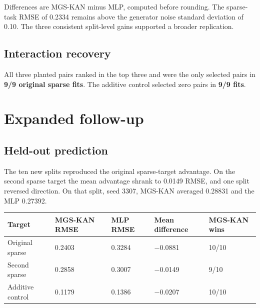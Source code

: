 \documentclass[11pt]{article}
\numberwithin{equation}{section}
\begin{document}
Differences are MGS-KAN minus MLP, computed before rounding. The sparse-task RMSE of 0.2334
remains above the generator noise standard deviation of 0.10. The three consistent split-level
gains supported a broader replication.

\subsection{Interaction recovery}

All three planted pairs ranked in the top three and were the only selected pairs in
\textbf{9/9 original sparse fits}. The additive control selected zero pairs in
\textbf{9/9 fits}.

\section{Expanded follow-up}

\subsection{Held-out prediction}

The ten new splits reproduced the original sparse-target advantage. On the second sparse
target the mean advantage shrank to 0.0149 RMSE, and one split reversed direction. On that
split, seed 3307, MGS-KAN averaged 0.28831 and the MLP 0.27392.

\begin{center}
\small
\begin{tabularx}{\linewidth}{@{} Y Z Z Z Z @{}}
\toprule
\textbf{Target} & \textbf{MGS-KAN RMSE} & \textbf{MLP RMSE} & \textbf{Mean difference} & \textbf{MGS-KAN wins} \\
\midrule
Original sparse & 0.2403 & 0.3284 & \ensuremath{-}0.0881 & 10/10 \\
Second sparse & 0.2858 & 0.3007 & \ensuremath{-}0.0149 & 9/10 \\
Additive control & 0.1179 & 0.1386 & \ensuremath{-}0.0207 & 10/10 \\
\bottomrule
\end{tabularx}
\end{center}
\end{document}
